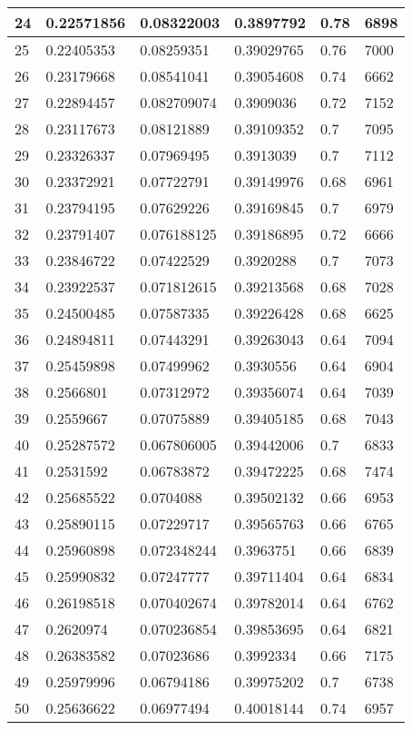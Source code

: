 \begin{longtable}{|l|l|l|l|l|l|}
24 & 0.22571856 & 0.08322003 & 0.3897792 & 0.78 & 6898 \\ \hline 
25 & 0.22405353 & 0.08259351 & 0.39029765 & 0.76 & 7000 \\ \hline 
26 & 0.23179668 & 0.08541041 & 0.39054608 & 0.74 & 6662 \\ \hline 
27 & 0.22894457 & 0.082709074 & 0.3909036 & 0.72 & 7152 \\ \hline 
28 & 0.23117673 & 0.08121889 & 0.39109352 & 0.7 & 7095 \\ \hline 
29 & 0.23326337 & 0.07969495 & 0.3913039 & 0.7 & 7112 \\ \hline 
30 & 0.23372921 & 0.07722791 & 0.39149976 & 0.68 & 6961 \\ \hline 
31 & 0.23794195 & 0.07629226 & 0.39169845 & 0.7 & 6979 \\ \hline 
32 & 0.23791407 & 0.076188125 & 0.39186895 & 0.72 & 6666 \\ \hline 
33 & 0.23846722 & 0.07422529 & 0.3920288 & 0.7 & 7073 \\ \hline 
34 & 0.23922537 & 0.071812615 & 0.39213568 & 0.68 & 7028 \\ \hline 
35 & 0.24500485 & 0.07587335 & 0.39226428 & 0.68 & 6625 \\ \hline 
36 & 0.24894811 & 0.07443291 & 0.39263043 & 0.64 & 7094 \\ \hline 
37 & 0.25459898 & 0.07499962 & 0.3930556 & 0.64 & 6904 \\ \hline 
38 & 0.2566801 & 0.07312972 & 0.39356074 & 0.64 & 7039 \\ \hline 
39 & 0.2559667 & 0.07075889 & 0.39405185 & 0.68 & 7043 \\ \hline 
40 & 0.25287572 & 0.067806005 & 0.39442006 & 0.7 & 6833 \\ \hline 
41 & 0.2531592 & 0.06783872 & 0.39472225 & 0.68 & 7474 \\ \hline 
42 & 0.25685522 & 0.0704088 & 0.39502132 & 0.66 & 6953 \\ \hline 
43 & 0.25890115 & 0.07229717 & 0.39565763 & 0.66 & 6765 \\ \hline 
44 & 0.25960898 & 0.072348244 & 0.3963751 & 0.66 & 6839 \\ \hline 
45 & 0.25990832 & 0.07247777 & 0.39711404 & 0.64 & 6834 \\ \hline 
46 & 0.26198518 & 0.070402674 & 0.39782014 & 0.64 & 6762 \\ \hline 
47 & 0.2620974 & 0.070236854 & 0.39853695 & 0.64 & 6821 \\ \hline 
48 & 0.26383582 & 0.07023686 & 0.3992334 & 0.66 & 7175 \\ \hline 
49 & 0.25979996 & 0.06794186 & 0.39975202 & 0.7 & 6738 \\ \hline 
50 & 0.25636622 & 0.06977494 & 0.40018144 & 0.74 & 6957 \\ \hline 
\end{longtable}